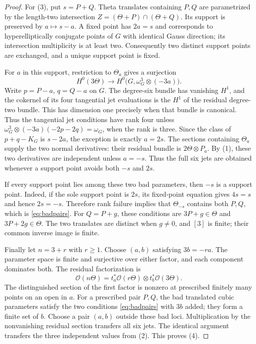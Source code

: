 \documentclass[11pt]{article}
\theoremstyle{definition}\newtheorem{definition}[theorem]{Definition}
\theoremstyle{remark}\newtheorem{remark}[theorem]{Remark}
\newcommand{\OO}{\mathcal O}
\begin{document}
\begin{proof}
For (3), put $s=P+Q$. Theta translates containing $P,Q$ are parametrized by the length-two intersection $Z=(\Theta+P)\cap(\Theta+Q)$. Its support is preserved by $a\mapsto s-a$. A fixed point has $2a=s$ and corresponds to hyperelliptically conjugate points of $G$ with identical Gauss direction; its intersection multiplicity is at least two. Consequently two distinct support points are exchanged, and a unique support point is fixed.

For $a$ in this support, restriction to $\Theta_a$ gives a surjection
\[
 H^0(3\Theta)\longrightarrow H^0\bigl(G,\omega_G^3\otimes(-3a)\bigr).
\]
Write $p=P-a$, $q=Q-a$ on $G$. The degree-six bundle has vanishing $H^1$, and the cokernel of its four tangential jet evaluations is the $H^1$ of the residual degree-two bundle. This has dimension one precisely when that bundle is canonical. Thus the tangential jet conditions have rank four unless
$\omega_G^3\otimes(-3a)(-2p-2q)=\omega_G$, when the rank is three. Since the class of $p+q-K_G$ is $s-2a$, the exception is exactly $a=2s$. The sections containing $\Theta_a$ supply the two normal derivatives: their residual bundle is $2\Theta\otimes P_a$. By (1), these two derivatives are independent unless $a=-s$. Thus the full six jets are obtained whenever a support point avoids both $-s$ and $2s$.

If every support point lies among these two bad parameters, then $-s$ is a support point. Indeed, if the sole support point is $2s$, its fixed-point equation gives $4s=s$ and hence $2s=-s$. Therefore rank failure implies that $\Theta_{-s}$ contains both $P,Q$, which is \eqref{eq:badpairs}. For $Q=P+g$, these conditions are $3P+g\in\Theta$ and $3P+2g\in\Theta$. The two translates are distinct when $g\ne0$, and $[3]$ is finite; their common inverse image is finite.

Finally let $n=3+r$ with $r\ge1$. Choose $(a,b)$ satisfying $3b=-ra$. The parameter space is finite and surjective over either factor, and each component dominates both. The residual factorization is
\[
 \OO(n\Theta)=t_a^*\OO(r\Theta)\otimes t_b^*\OO(3\Theta).
\]
The distinguished section of the first factor is nonzero at prescribed finitely many points on an open in $a$. For a prescribed pair $P,Q$, the bad translated cubic parameters satisfy the two conditions \eqref{eq:badpairs} with $3b$ added; they form a finite set of $b$. Choose a pair $(a,b)$ outside these bad loci. Multiplication by the nonvanishing residual section transfers all six jets. The identical argument transfers the three independent values from (2). This proves (4).
\end{proof}
\end{document}

